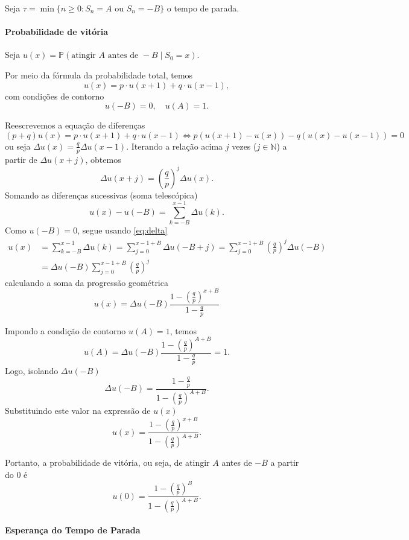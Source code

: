 \documentclass{article}
\begin{document}
Seja \( \tau = \min \{ n \geq 0 : S_n = A \text{ ou } S_n = -B \} \) o
tempo de parada.

\paragraph{Probabilidade de vitória}

Seja \( u(x) = \mathbb{P}(\text{atingir } A \text{ antes de } -B \mid S_0 = x) \).


Por meio da fórmula da probabilidade total, temos
\[
u(x) = p \cdot u(x + 1) + q \cdot u(x - 1),
\]
com condições de contorno
\[
u(-B) = 0, \quad u(A) = 1.
\]

Reescrevemos a equação de diferenças
\[
(p+q)u(x) = p \cdot u(x + 1) + q \cdot u(x - 1) \Leftrightarrow
 p ( u(x + 1) - u(x)) - q(u(x) -  u(x - 1)) = 0
\]
ou seja $\Delta u(x) = \tfrac qp \Delta u(x-1)$. Iterando a relação
acima $j$ vezes ($j\in\mathbb N$) a partir de $\Delta u(x+j)$, obtemos
\begin{equation}
  \label{eq:delta}
  \Delta u(x+j) = \left(\frac{q}{p}\right)^{j} \Delta u(x).
\end{equation}
Somando as diferenças sucessivas (soma telescópica) 
\[
u(x) -  u(-B) =  \sum_{k = -B}^{x - 1} \Delta u(k).
\]
Como \( u(-B) = 0 \), segue usando  \eqref{eq:delta}
\begin{align*}
  u(x) &= \sum_{k = -B}^{x - 1} \Delta u(k)
         =\sum_{j=0}^{x - 1 +B} \Delta u(-B+j)
         =\sum_{j=0}^{x - 1 +B}  \left(\frac{q}{p}\right)^j \Delta u(-B)\\
         &=   \Delta u(-B) \sum_{j=0}^{x - 1 +B}  \left(\frac{q}{p}\right)^j 
\end{align*}
calculando a soma da progressão geométrica
\[
u(x) = \Delta u(-B) \frac{1- \left(\frac qp \right)^{x+B}}{1- \frac qp }
\]

Impondo a condição de contorno \( u(A) = 1 \), temos
\[
u(A) = \Delta u(-B) \frac{1 - \left(\frac{q}{p}\right)^{A + B}}{1 - \frac{q}{p}} = 1.
\]
Logo, isolando \(\Delta u(-B)\)
\[
\Delta u(-B) = \frac{1 - \frac{q}{p}}{1 - \left(\frac{q}{p}\right)^{A + B}}.
\]
Substituindo este valor na expressão de \(u(x)\)
\[
u(x) = \frac{1 - \left(\frac{q}{p}\right)^{x + B}}{1 - \left(\frac{q}{p}\right)^{A + B}}.
\]

Portanto, a probabilidade de vitória, ou seja, de atingir \(A\) antes de \(-B\) a partir do $0$ é
\[
u(0) = \frac{1 - \left(\frac{q}{p}\right)^{B}}{1 - \left(\frac{q}{p}\right)^{A + B}}.
\]

\paragraph{Esperança do Tempo de Parada}
\end{document}
